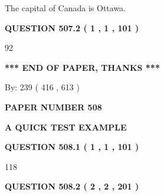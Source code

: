 \documentclass[12pt]{article}
\begin{document}
 
The capital of Canada is Ottawa.
 
 
 
 
  
\vspace{0.2in}
  
{\textbf{\Large{QUESTION
507.2 
 ( 1 , 1 , 101 )
}}}
  
  
 
 
\noindent{}

92
 
 
   
   
 \vspace{0.2in}
 
   
   
   
   
\vspace{1.0in} 
{\textbf{\large{ *** END OF PAPER, THANKS *** }}} 
   
   
\hspace{1.0in} By: 
 239 ( 416 ,  613 )
   
   
   
   
\newpage 
\setcounter{page}{ 
   508001 } 
   
   
   
   
 {\textbf{ \Large{ PAPER NUMBER  508  }}}
   
   
\vspace{0.2in}
   
   
   
   
   
   
 \vspace{0.2in}
{\LARGE {\textbf{ A QUICK TEST EXAMPLE}}}
   
   
  
\vspace{0.2in}
  
{\textbf{\Large{QUESTION
508.1 
 ( 1 , 1 , 101 )
}}}
  
  
 
 
\noindent{}

118
 
 
  
\vspace{0.2in}
  
{\textbf{\Large{QUESTION
508.2 
 ( 2 , 2 , 201 )
}}}
  
\end{document}
